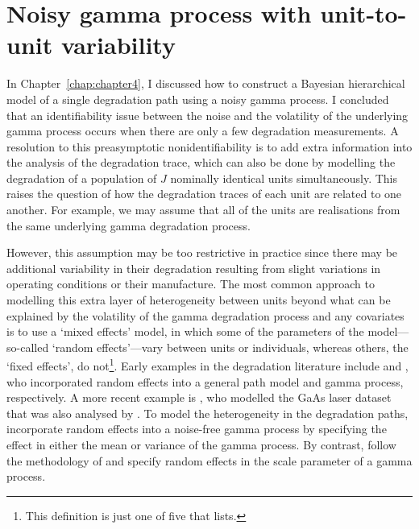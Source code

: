\chapter{Noisy gamma process with unit-to-unit variability} \label{chap:chapter5}

In Chapter~\ref{chap:chapter4}, I discussed how to construct a Bayesian hierarchical model of a single degradation path using a noisy gamma process. I concluded that an identifiability issue between the noise and the volatility of the underlying gamma process occurs when there are only a few degradation measurements. A resolution to this preasymptotic nonidentifiability is to add extra information into the analysis of the degradation trace, which can also be done by modelling the degradation of a population of $J$ nominally identical units simultaneously. This raises the question of how the degradation traces of each unit are related to one another. For example, we may assume that all of the units are realisations from the same underlying gamma degradation process.

However, this assumption may be too restrictive in practice since there may be additional variability in their degradation resulting from slight variations in operating conditions or their manufacture. The most common approach to modelling this extra layer of heterogeneity between units beyond what can be explained by the volatility of the gamma degradation process and any covariates is to use a `mixed effects' model, in which some of the parameters of the model---so-called `random effects'---vary between units or individuals, whereas others, the `fixed effects', do not\footnote{This definition is just one of five that \citet{Gelman2005} lists.}. Early examples in the degradation literature include \citet{lu1993} and \citet{lawless2004}, who incorporated random effects into a general path model and gamma process, respectively. A more recent example is \citet{rodriguez-picon2018}, who modelled the GaAs laser dataset that was also analysed by \citet{Meeker1998}. To model the heterogeneity in the degradation paths, \citet{rodriguez-picon2018} incorporate random effects into a noise-free gamma process by specifying the effect in either the mean or variance of the gamma process. By contrast, \citet{peng_2018} follow the methodology of \citet{lawless2004} and specify random effects in the scale parameter of a gamma process.

